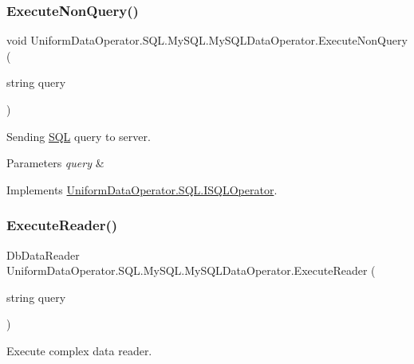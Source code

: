 \subsubsection{\texorpdfstring{Execute\+Non\+Query()}{ExecuteNonQuery()}}
{\footnotesize\ttfamily void Uniform\+Data\+Operator.\+S\+Q\+L.\+My\+S\+Q\+L.\+My\+S\+Q\+L\+Data\+Operator.\+Execute\+Non\+Query (\begin{DoxyParamCaption}\item[{string}]{query }\end{DoxyParamCaption})}



Sending \mbox{\hyperlink{namespace_uniform_data_operator_1_1_s_q_l}{S\+QL}} query to server. 


\begin{DoxyParams}{Parameters}
{\em query} & \\
\hline
\end{DoxyParams}


Implements \mbox{\hyperlink{interface_uniform_data_operator_1_1_s_q_l_1_1_i_s_q_l_operator_a15108adeb878698e82104e374ac37ef2}{Uniform\+Data\+Operator.\+S\+Q\+L.\+I\+S\+Q\+L\+Operator}}.

\mbox{\label{class_uniform_data_operator_1_1_s_q_l_1_1_my_s_q_l_1_1_my_s_q_l_data_operator_aef1f1d171818fffe2f0c0642de27596d}} 
\subsubsection{\texorpdfstring{Execute\+Reader()}{ExecuteReader()}}
{\footnotesize\ttfamily Db\+Data\+Reader Uniform\+Data\+Operator.\+S\+Q\+L.\+My\+S\+Q\+L.\+My\+S\+Q\+L\+Data\+Operator.\+Execute\+Reader (\begin{DoxyParamCaption}\item[{string}]{query }\end{DoxyParamCaption})}



Execute complex data reader. 


